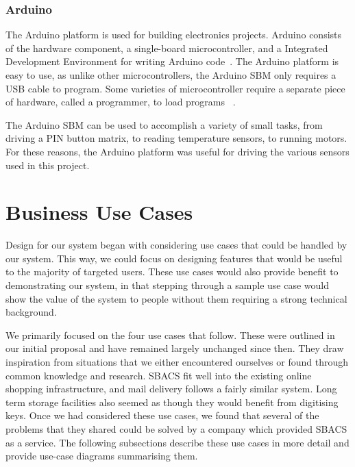 \documentclass[12pt]{report}
\let\Oldsubsection\subsection
\renewcommand{\subsection}{\FloatBarrier\Oldsubsection}
\begin{document}
\subsection{Arduino} \label{arduino}

The Arduino platform is used for building electronics projects. Arduino consists of the hardware component, a 
single-board microcontroller, and a Integrated Development Environment for writing Arduino code~\autocite{WHATISARDUINO}. 
The Arduino platform is easy to use, as unlike other microcontrollers, the Arduino SBM only requires a USB cable to 
program. Some varieties of microcontroller require a separate piece of hardware, called a programmer, to load programs 
~\autocite{MCUPROGRAMMER}.

The Arduino SBM can be used to accomplish a variety of small tasks, from driving a PIN button matrix, to reading 
temperature sensors, to running motors. For these reasons, the Arduino platform was useful for driving the various 
sensors used in this project.


\chapter{Business Use Cases} \label{business-use-cases}

Design for our system began with considering use cases that could be handled by our system. This way, we could focus on 
designing features that would be useful to the majority of targeted users. These use cases would also provide benefit to demonstrating our system, in that stepping
through a sample use case would show the value of the system to people without them requiring a strong technical
background.

We primarily focused on the four use cases that follow. These were outlined in our initial proposal and have remained
largely unchanged since then. They draw inspiration from situations that we either encountered ourselves or found
through common knowledge and research. SBACS fit well into the existing online shopping infrastructure, and
mail delivery follows a fairly similar system. Long term storage facilities also seemed as though they
would benefit from digitising keys. Once we had considered these use cases, we found that several of
the problems that they shared could be solved by a company which provided SBACS as a service. The following subsections
describe these use cases in more detail and provide use-case diagrams summarising them.
\end{document}
